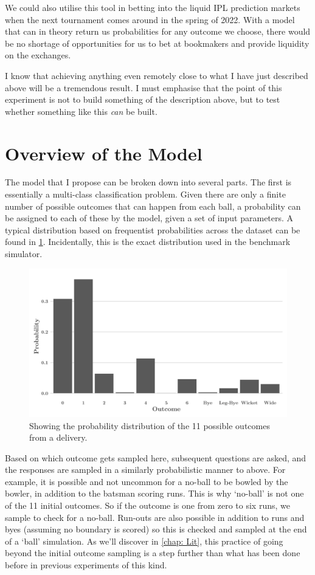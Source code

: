 We could also utilise this tool in betting into the liquid IPL prediction markets when the next tournament comes around in the spring of 2022. With a model that can in theory return us probabilities for any outcome we choose, there would be no shortage of opportunities for us to bet at bookmakers and provide liquidity on the exchanges.

I know that achieving anything even remotely close to what I have just described above will be a tremendous result. I must emphasise that the point of this experiment is not to build something of the description above, but to test whether something like this \textit{can} be built.

\section{Overview of the Model}

The model that I propose can be broken down into several parts. The first is essentially a multi-class classification problem. Given there are only a finite number of possible outcomes that can happen from each ball, a probability can be assigned to each of these by the model, given a set of input parameters. A typical distribution based on frequentist probabilities across the dataset can be found in \cref{fig:intro}. Incidentally, this is the exact distribution used in the
benchmark simulator.

\begin{figure}[h]
    \centering
    \includegraphics[width=0.75\columnwidth]{images/intro2.png}
    \caption{Showing the probability distribution of the 11 possible outcomes from a delivery.}
    \label{fig:intro}
\end{figure}

Based on which outcome gets sampled here, subsequent questions are asked, and the responses are sampled in a similarly probabilistic manner to above. For example, it is possible and not uncommon for a no-ball to be bowled by the bowler, in addition to the batsman scoring runs. This is why ‘no-ball’ is not one of the 11 initial outcomes. So if the outcome is one from zero to six runs, we sample to check for a no-ball. Run-outs are also possible in addition to runs and byes (assuming no boundary is scored) so this is checked and sampled at the end of a ‘ball’ simulation. As we’ll discover in \cref{chap: Lit}, this practice of going beyond the initial outcome sampling is a step further than what has been done before in previous experiments of this kind.